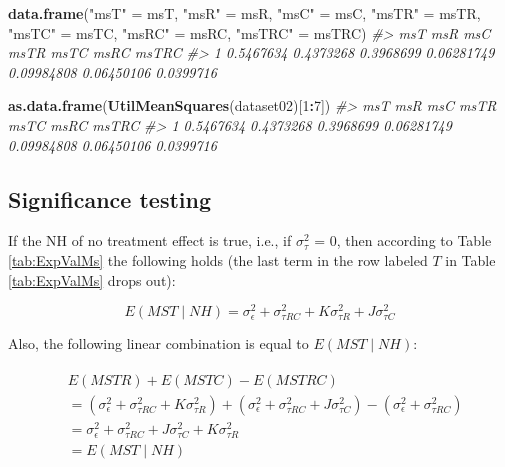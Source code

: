 \documentclass[
]{book}
\newenvironment{Shaded}{\begin{snugshade}}{\end{snugshade}}
\newcommand{\CommentTok}[1]{\textcolor[rgb]{0.56,0.35,0.01}{\textit{#1}}}
\newcommand{\DecValTok}[1]{\textcolor[rgb]{0.00,0.00,0.81}{#1}}
\newcommand{\KeywordTok}[1]{\textcolor[rgb]{0.13,0.29,0.53}{\textbf{#1}}}
\newcommand{\NormalTok}[1]{#1}
\newcommand{\OperatorTok}[1]{\textcolor[rgb]{0.81,0.36,0.00}{\textbf{#1}}}
\newcommand{\StringTok}[1]{\textcolor[rgb]{0.31,0.60,0.02}{#1}}
\begin{document}
\begin{Shaded}
\begin{Highlighting}[]
\KeywordTok{data.frame}\NormalTok{(}\StringTok{"msT"}\NormalTok{ =}\StringTok{ }\NormalTok{msT, }\StringTok{"msR"}\NormalTok{ =}\StringTok{ }\NormalTok{msR, }\StringTok{"msC"}\NormalTok{ =}\StringTok{ }\NormalTok{msC, }
           \StringTok{"msTR"}\NormalTok{ =}\StringTok{ }\NormalTok{msTR, }\StringTok{"msTC"}\NormalTok{ =}\StringTok{ }\NormalTok{msTC, }
           \StringTok{"msRC"}\NormalTok{ =}\StringTok{ }\NormalTok{msRC, }\StringTok{"msTRC"}\NormalTok{ =}\StringTok{ }\NormalTok{msTRC)}
\CommentTok{\#\textgreater{}         msT       msR       msC       msTR       msTC       msRC     msTRC}
\CommentTok{\#\textgreater{} 1 0.5467634 0.4373268 0.3968699 0.06281749 0.09984808 0.06450106 0.0399716}

\KeywordTok{as.data.frame}\NormalTok{(}\KeywordTok{UtilMeanSquares}\NormalTok{(dataset02)[}\DecValTok{1}\OperatorTok{:}\DecValTok{7}\NormalTok{])}
\CommentTok{\#\textgreater{}         msT       msR       msC       msTR       msTC       msRC     msTRC}
\CommentTok{\#\textgreater{} 1 0.5467634 0.4373268 0.3968699 0.06281749 0.09984808 0.06450106 0.0399716}
\end{Highlighting}
\end{Shaded}

\hypertarget{DBMAnalysisSigtesting-sig-testing}{%
\subsection{Significance testing}\label{DBMAnalysisSigtesting-sig-testing}}

If the NH of no treatment effect is true, i.e., if \(\sigma_{\tau}^{2}\) = 0, then according to Table \ref{tab:ExpValMs} the following holds (the last term in the row labeled \(T\) in Table \ref{tab:ExpValMs} drops out):

\begin{equation}
E\left ( MST\mid NH \right ) = \sigma_{\epsilon}^{2} + \sigma_{\tau RC}^{2} + K\sigma_{\tau R}^{2} + J\sigma_{\tau C}^{2}
\label{eq:ExpMST}
\end{equation}

Also, the following linear combination is equal to \(E\left ( MST\mid NH \right )\):

\begin{align}
\begin{split}
&E\left ( MSTR \right ) + E\left ( MSTC \right )  - E\left ( MSTRC \right ) \\
&= \left (\sigma_{\epsilon}^{2} + \sigma_{\tau RC}^{2} + K\sigma_{\tau R}^{2} \right ) + \left (\sigma_{\epsilon}^{2} + \sigma_{\tau RC}^{2} + J\sigma_{\tau C}^{2} \right ) -\left (\sigma_{\epsilon}^{2} + \sigma_{\tau RC}^{2}  \right ) \\
&= \sigma_{\epsilon}^{2} + \sigma_{\tau RC}^{2} + J \sigma_{\tau C}^{2} +  K\sigma_{\tau R}^{2} \\
&= E\left ( MST\mid NH \right )
\end{split}
\label{eq:linearComb}
\end{align}
\end{document}

